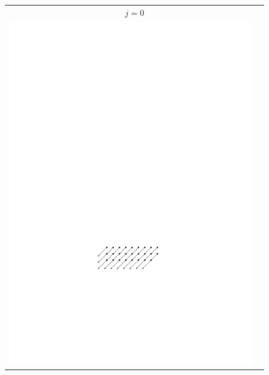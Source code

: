 \documentclass{ws-ijcga}
\begin{document}
\begin{figure}
\begin{tabular}{cc}
\multicolumn{2}{c}{$j=0$}\\
     \includegraphics[scale=0.9]{j1} & 

\end{tabular}
\end{figure}
\end{document}
